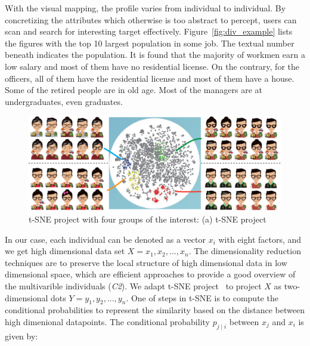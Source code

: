 With the visual mapping, the profile varies from individual to individual. By concretizing the attributes which otherwise is too abstract to percept, users can scan and search for interesting target effectively. Figure~\ref{fig:div_example} lists the figures with the top 10 largest population in some job. The textual number beneath indicates the population. It is found that the majority of workmen earn a low salary and most of them have no residential license. On the contrary, for the officers, all of them have the residential license and most of them have a house. Some of the retired people are in old age. Most of the managers are at undergraduates, even graduates.


\begin{figure}[htb!]
 \centering %
 \includegraphics[width=\columnwidth]{pictures/tsne}
 \caption{t-SNE project with four groups of the interest: (a) t-SNE project }
 \label{fig:tsne}
\end{figure}

In our case, each individual can be denoted as a vector $x_i$ with eight factors, and we get high dimensional data set $X={x_1, x_2, ..., x_n}$. The dimensionality reduction techniques are to preserve the local structure of high dimensional data in low dimensional space, which are efficient approaches to provide a good overview of the multivarible individuals (\textit{C2}). We adapt t-SNE project~\citep{maaten2008visualizing} to project $X$ as two-dimensional dots $Y={y_1, y_2, ..., y_n}$. One of steps in t-SNE is to compute the conditional probabilities to represent the similarity based on the distance between high dimenional datapoints. The conditional probability $p_{j\mid i}$ between $x_j$ and $x_i$ is given by:

